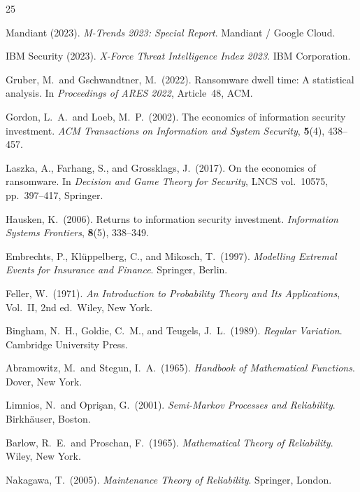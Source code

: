 \documentclass[12pt,a4paper]{article}
\theoremstyle{plain}
\theoremstyle{definition}
\theoremstyle{remark}
\begin{document}
\begin{thebibliography}{25}

Mandiant (2023).
\textit{M-Trends 2023: Special Report}.
Mandiant / Google Cloud.

IBM Security (2023).
\textit{X-Force Threat Intelligence Index 2023}.
IBM Corporation.

Gruber, M.\ and Gschwandtner, M.\ (2022).
Ransomware dwell time: A statistical analysis.
In \textit{Proceedings of ARES 2022}, Article~48, ACM.

Gordon, L.\ A.\ and Loeb, M.\ P.\ (2002).
The economics of information security investment.
\textit{ACM Transactions on Information and System Security},
\textbf{5}(4), 438--457.

Laszka, A., Farhang, S., and Grossklags, J.\ (2017).
On the economics of ransomware.
In \textit{Decision and Game Theory for Security},
LNCS vol.~10575, pp.~397--417, Springer.

Hausken, K.\ (2006).
Returns to information security investment.
\textit{Information Systems Frontiers}, \textbf{8}(5), 338--349.

Embrechts, P., Kl\"{u}ppelberg, C., and Mikosch, T.\ (1997).
\textit{Modelling Extremal Events for Insurance and Finance}.
Springer, Berlin.

Feller, W.\ (1971).
\textit{An Introduction to Probability Theory and Its Applications},
Vol.~II, 2nd ed.\ Wiley, New York.

Bingham, N.\ H., Goldie, C.\ M., and Teugels, J.\ L.\ (1989).
\textit{Regular Variation}.
Cambridge University Press.

Abramowitz, M.\ and Stegun, I.\ A.\ (1965).
\textit{Handbook of Mathematical Functions}.
Dover, New York.

Limnios, N.\ and Opri\c{s}an, G.\ (2001).
\textit{Semi-Markov Processes and Reliability}.
Birkh\"{a}user, Boston.

Barlow, R.\ E.\ and Proschan, F.\ (1965).
\textit{Mathematical Theory of Reliability}.
Wiley, New York.

Nakagawa, T.\ (2005).
\textit{Maintenance Theory of Reliability}.
Springer, London.


\end{thebibliography}
\end{document}
